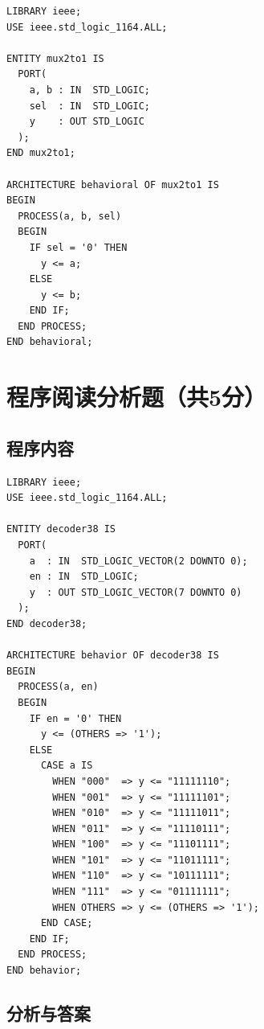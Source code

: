 \begin{lstlisting}[style=Vivado]
LIBRARY ieee;
USE ieee.std_logic_1164.ALL;

ENTITY mux2to1 IS
  PORT(
    a, b : IN  STD_LOGIC;
    sel  : IN  STD_LOGIC;
    y    : OUT STD_LOGIC
  );
END mux2to1;

ARCHITECTURE behavioral OF mux2to1 IS
BEGIN
  PROCESS(a, b, sel)
  BEGIN
    IF sel = '0' THEN
      y <= a;
    ELSE
      y <= b;
    END IF;
  END PROCESS;
END behavioral;
\end{lstlisting}

\section{程序阅读分析题（共5分）}

\subsection*{程序内容}

\begin{lstlisting}[style=Vivado]
LIBRARY ieee;
USE ieee.std_logic_1164.ALL;

ENTITY decoder38 IS
  PORT(
    a  : IN  STD_LOGIC_VECTOR(2 DOWNTO 0);
    en : IN  STD_LOGIC;
    y  : OUT STD_LOGIC_VECTOR(7 DOWNTO 0)
  );
END decoder38;

ARCHITECTURE behavior OF decoder38 IS
BEGIN
  PROCESS(a, en)
  BEGIN
    IF en = '0' THEN
      y <= (OTHERS => '1');
    ELSE
      CASE a IS
        WHEN "000"  => y <= "11111110";
        WHEN "001"  => y <= "11111101";
        WHEN "010"  => y <= "11111011";
        WHEN "011"  => y <= "11110111";
        WHEN "100"  => y <= "11101111";
        WHEN "101"  => y <= "11011111";
        WHEN "110"  => y <= "10111111";
        WHEN "111"  => y <= "01111111";
        WHEN OTHERS => y <= (OTHERS => '1');
      END CASE;
    END IF;
  END PROCESS;
END behavior;
\end{lstlisting}

\subsection*{分析与答案}

